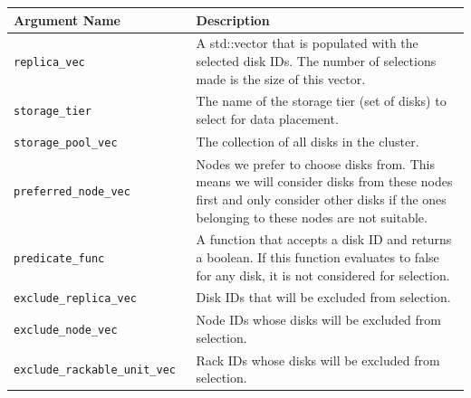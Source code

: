 \documentclass[12pt]{article}
\begin{document}
    \begin{center}
      \begin{tabular}{ | p{0.4\linewidth} | p{0.6\linewidth} | }
        \hline
        \textbf{Argument Name} & \textbf{Description} \\ \hline
        \verb|replica_vec| & A std::vector that is populated with the selected
                             disk IDs. The number of selections made is the
                             size of this vector. \\ \hline

        \verb|storage_tier| & The name of the storage tier (set of disks) to
                              select for data placement. \\ \hline
 
        \verb|storage_pool_vec| & The collection of all disks in the cluster.  \\ \hline

        \verb|preferred_node_vec| & Nodes we prefer to choose disks from. This
                                    means we will consider disks from these
                                    nodes first and only consider other disks
                                    if the ones belonging to these nodes are
                                    not suitable. \\ \hline

        \verb|predicate_func| & A function that accepts a disk ID and returns a
                                boolean. If this function evaluates to false
                                for any disk, it is not considered for
                                selection. \\ \hline

        \verb|exclude_replica_vec| & Disk IDs that will be excluded from
                                     selection. \\ \hline

        \verb|exclude_node_vec| & Node IDs whose disks will be excluded from
                                  selection. \\ \hline

        \verb|exclude_rackable_unit_vec| & Rack IDs whose disks will be
                                           excluded from selection. \\ \hline

        \hline
      \end{tabular}
    \end{center}
\end{document}
